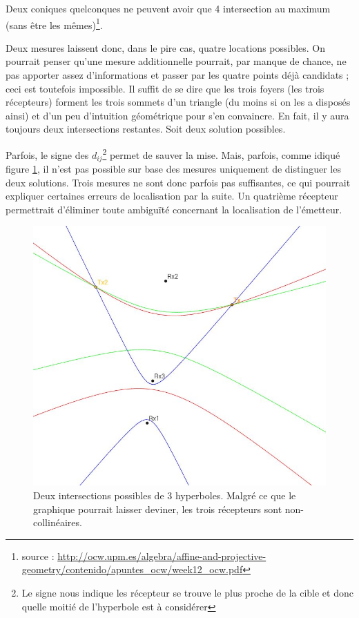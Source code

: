 \documentclass[10pt,a4paper]{article}
\begin{document}
Deux coniques quelconques ne peuvent avoir que 4 intersection au maximum (sans être les mêmes)\footnote{source : \url{http://ocw.upm.es/algebra/affine-and-projective-geometry/contenido/apuntes_ocw/week12_ocw.pdf}}. 

Deux mesures laissent donc, dans le pire cas, quatre locations possibles. On pourrait penser qu'une mesure additionnelle pourrait, par manque de chance, ne pas apporter assez d'informations et passer par les quatre points déjà candidats ; ceci est toutefois impossible. Il suffit de se dire que les trois foyers (les trois récepteurs) forment les trois sommets d'un triangle (du moins si on les a disposés ainsi) et d'un peu d'intuition géométrique pour s'en convaincre. En fait, il y aura toujours deux intersections restantes. Soit deux solution possibles.

Parfois, le signe des $d_{ij}$\footnote{Le signe nous indique les récepteur se trouve le plus proche de la cible et donc quelle moitié de l'hyperbole est à considérer} permet de sauver la mise. Mais, parfois, comme idiqué figure \ref{int}, il n'est pas possible sur base des mesures uniquement de distinguer les deux solutions. Trois mesures ne sont donc parfois pas suffisantes, ce qui pourrait expliquer certaines erreurs de localisation par la suite. Un quatrième récepteur permettrait d'éliminer toute ambiguïté concernant la localisation de l'émetteur.

\begin{figure}[h]
\centering
\includegraphics[scale = 0.5]{hyperbole}
\caption{Deux intersections possibles de 3 hyperboles. Malgré ce que le graphique pourrait laisser deviner, les trois récepteurs sont non-collinéaires.}
\label{int}
\end{figure}
\end{document}
